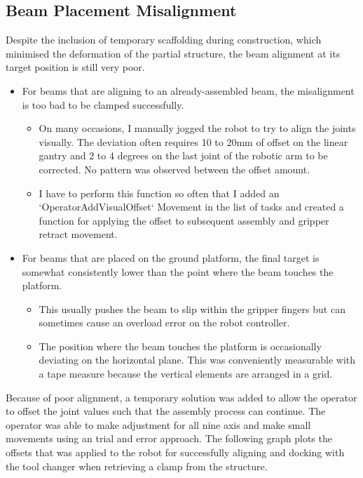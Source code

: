 \subsection{Beam Placement Misalignment}

Despite the inclusion of temporary scaffolding during construction, which minimised the deformation of the partial structure, the beam alignment at its target position is still very poor.

\begin{itemize}
	\item For beams that are aligning to an already-assembled beam, the misalignment is too bad to be clamped successfully. 

\begin{itemize}
	\item On many occasions, I manually jogged the robot to try to align the joints visually. The deviation often requires 10 to 20mm of offset on the linear gantry and 2 to 4 degrees on the last joint of the robotic arm to be corrected. No pattern was observed between the offset amount.

	\item I have to perform this function so often that I added an `OperatorAddVisualOffset` Movement in the list of tasks and created a function for applying the offset to subsequent assembly and gripper retract movement. 

\end{itemize}
	\item For beams that are placed on the ground platform, the final target is somewhat consistently lower than the point where the beam touches the platform. 

\begin{itemize}
	\item This usually pushes the beam to slip within the gripper fingers but can sometimes cause an overload error on the robot controller.

	\item The position where the beam touches the platform is occasionally deviating on the horizontal plane. This was conveniently measurable with a tape measure because the vertical elements are arranged in a grid.

\end{itemize}
\end{itemize}


Because of poor alignment, a temporary solution was added to allow the operator to offset the joint values such that the assembly process can continue. The operator was able to make adjustment for all nine axis and make small movements using an trial and error approach. The following graph plots the offsets that was applied to the robot for successfully aligning and docking with the tool changer when retrieving a clamp from the structure.


